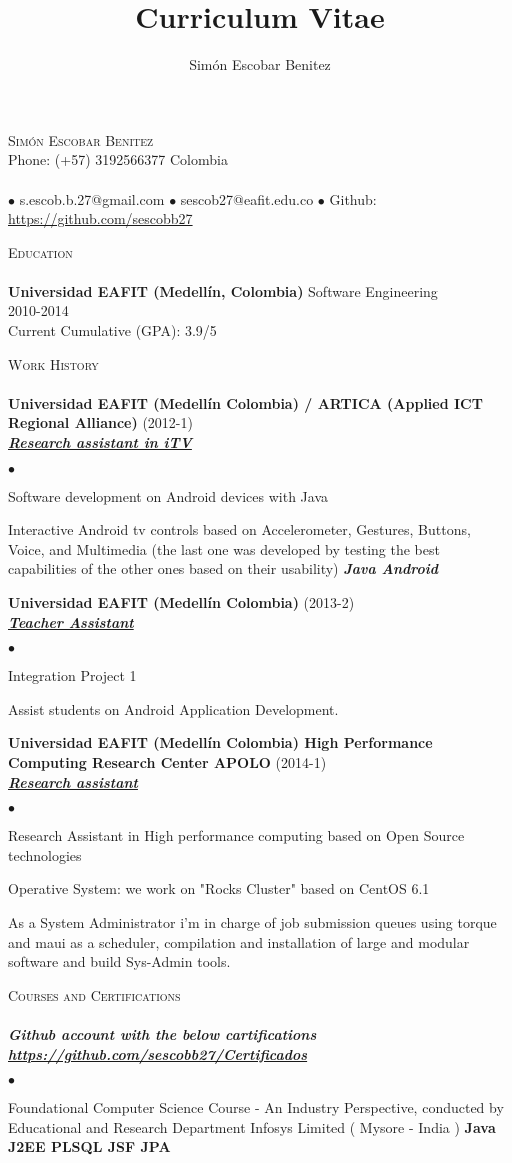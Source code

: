 \documentclass[a4paper]{article}
\title{Curriculum Vitae}
\author{Sim\'on Escobar Benitez}
\newcommand{\lineunder}{\vspace*{-8pt} \\ \hspace*{-18pt} \hrulefill \\}
\newcommand{\header}[1]{{\hspace*{-15pt}\vspace*{6pt}
    \textsc{#1}} \vspace*{-6pt} \lineunder}
\newcommand{\employer}[3]{{
    \textbf{#1} (#2)\\ \underline{\textbf{\emph{#3}}}\\ }}
\newcommand{\contact}[3]{
  \vspace*{-8pt}
  \begin{center}
    {\LARGE \scshape {#1}}\\ #2 \lineunder #3
  \end{center}
  \vspace*{-8pt} }
\newenvironment{achievements}{\begin{list}{$\bullet$}{\topsep 0pt \itemsep
      -2pt}}{\vspace*{4pt}\end{list}}
\newcommand{\schoolwithcourses}[4]{
  \textbf{#1} #2 \\ #3\\ #4\\
  \vspace*{5pt} }
\newcommand{\programming}[1]{{\textbf{#1}}}
\newcommand{\emphasys}[1]{\textbf{\emph{#1}}}
\begin{document}
\small
\smallskip
\vspace*{-44pt}

\contact{Sim\'on Escobar Benitez} { Phone: (+57) 3192566377 Colombia } { $\bullet$ s.escob.b.27@gmail.com $\bullet$ sescob27@eafit.edu.co $\bullet$ Github: \url{https://github.com/sescobb27} }

\header{Education}

\schoolwithcourses{Universidad EAFIT (Medell\'in, Colombia)}{Software Engineering} {2010-2014} {Current Cumulative (GPA): 3.9/5}

\header{Work History}
\employer{ Universidad EAFIT (Medell\'in Colombia) / ARTICA (Applied ICT Regional Alliance)} {2012-1} {Research assistant in iTV}
\begin{achievements}
\item Software development on Android devices with Java
\item Interactive Android tv controls based on Accelerometer, Gestures, Buttons, Voice, and Multimedia (the last one was developed by testing the best capabilities of the other ones based on their usability) \emphasys{Java Android}
\end{achievements}

\employer{ Universidad EAFIT (Medell\'in Colombia) }{2013-2}{Teacher Assistant}
\begin{achievements}
\item Integration Project 1
\item Assist students on Android Application Development.
\end{achievements}

\employer{ Universidad EAFIT (Medell\'in Colombia) High Performance Computing Research Center APOLO}{2014-1}{Research assistant}
\begin{achievements}
\item Research Assistant in High performance computing based on Open Source technologies
\item Operative System: we work on "Rocks Cluster" based on CentOS 6.1
\item As a System Administrator i'm in charge of job submission queues using torque and maui as a scheduler, compilation and installation of large and modular software and build Sys-Admin tools.
\end{achievements}

\header{Courses and Certifications}
\emphasys{Github account with the below cartifications \url{https://github.com/sescobb27/Certificados}}
\begin{achievements}
\item Foundational Computer Science Course - An Industry Perspective, conducted by Educational and Research Department Infosys Limited ( Mysore - India )
\programming{Java J2EE PLSQL JSF JPA}
\end{achievements}
\end{document}
